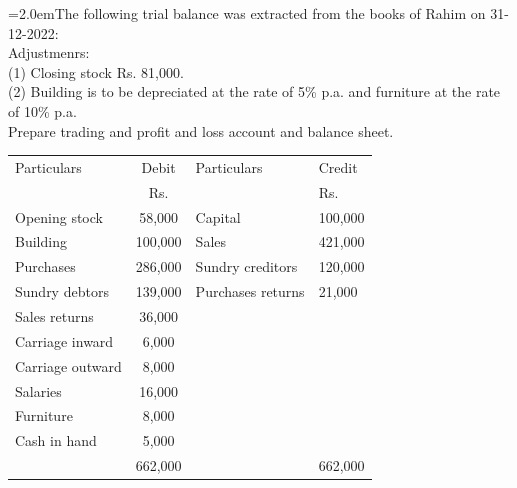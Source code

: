 \documentclass[11pt,a4paper]{article}
\newcommand{\lqn}[2]{\Needspace{6\baselineskip}\par\medskip\noindent\hangindent=2.0em\hangafter=1\makebox[2.0em][l]{\textbf{#1.}}#2\par}
\begin{document}
\lqn{97}{The following trial balance was extracted from the books of Rahim on 31-12-2022:\\
Adjustmenrs:\\
(1) Closing stock Rs. 81,000.\\
(2) Building is to be depreciated at the rate of 5\% p.a. and furniture at the rate of 10\% p.a.\\
Prepare trading and profit and loss account and balance sheet.\par
\par\smallskip\noindent\hspace*{1.2em}\begin{tabular}{|lcll|}
\hline
Particulars & Debit & Particulars & Credit \\
 & Rs. &  & Rs. \\
Opening stock & 58,000 & Capital & 100,000 \\
Building & 100,000 & Sales & 421,000 \\
Purchases & 286,000 & Sundry creditors & 120,000 \\
Sundry debtors & 139,000 & Purchases returns & 21,000 \\
Sales returns & 36,000 &  &  \\
Carriage inward & 6,000 &  &  \\
Carriage outward & 8,000 &  &  \\
Salaries & 16,000 &  &  \\
Furniture & 8,000 &  &  \\
Cash in hand & 5,000 &  &  \\
 & 662,000 &  & 662,000 \\
\hline
\end{tabular}\par\smallskip
}
\end{document}

